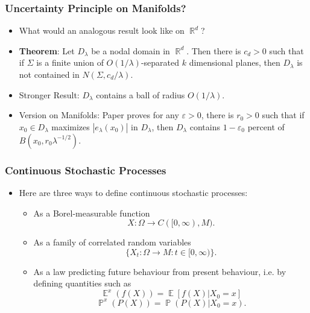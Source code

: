 \documentclass[usenames,dvipsnames,12pt]{beamer}
\DeclareMathOperator{\RR}{\mathbb{R}}
\DeclareMathOperator{\PP}{\mathbb{P}}
\DeclareMathOperator{\EE}{\mathbb{E}}
\begin{document}
\begin{frame}
    \frametitle{Uncertainty Principle on Manifolds?}

    \begin{itemize}
        \item What would an analogous result look like on $\RR^d$?

        \item {\bf Theorem}: Let $D_\lambda$ be a nodal domain in $\RR^d$. Then there is $c_d > 0$ such that if $\Sigma$ is a finite union of $O(1/\lambda)$-separated $k$ dimensional planes, then $D_\lambda$ is not contained in $N(\Sigma, c_d / \lambda)$.

        \item Stronger Result: $D_\lambda$ contains a ball of radius $O(1/\lambda)$.


        \item Version on Manifolds: Paper proves for any $\varepsilon > 0$, there is $r_0 > 0$ such that if $x_0 \in D_\lambda$ maximizes $|e_\lambda(x_0)|$ in $D_\lambda$, then $D_\lambda$ contains $1 - \varepsilon_0$ percent of $B(x_0,r_0 \lambda^{-1/2})$.
    \end{itemize}
\end{frame}

\begin{frame}
    \frametitle{Continuous Stochastic Processes}

    \begin{itemize}
        \item Here are three ways to define continuous stochastic processes:

        \begin{itemize}
            \item As a Borel-measurable function
            \[ X: \Omega \to C([0,\infty), M). \]

            \item As a family of correlated random variables
            \[ \{ X_t: \Omega \to M : t \in [0,\infty) \}. \]

            \item As a law predicting future behaviour from present behaviour, i.e. by defining quantities such as
            \[ \EE^x(f(X)) = \EE[f(X) | X_0 = x] \]
            \[ \PP^x(P(X)) = \PP(P(X) | X_0 = x). \]
        \end{itemize}
    \end{itemize}
\end{frame}
\end{document}
